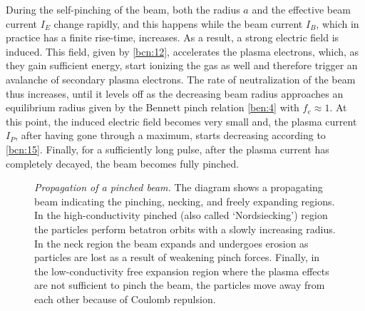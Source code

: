 \documentclass [12pt,a4paper,     ]{report} %
\begin{document}
During the self-pinching of the beam, both the radius $a$ and the effective beam current $I_E$ change rapidly, and this happens while the beam current $I_B$, which in practice has a finite rise-time, increases.  As a result, a strong electric field is induced.  This field, given by \eqref{bcn:12}, accelerates the plasma electrons, which, as they gain sufficient energy, start ionizing the gas as well and therefore trigger an avalanche of secondary plasma electrons.  The rate of neutralization of the beam thus increases, until it levels off as the decreasing beam radius approaches an equilibrium radius given by the Bennett pinch relation \eqref{ben:4} with $f_e \approx 1$.  At this point, the induced electric field becomes very small and, the plasma current $I_P$, after having gone through a maximum, starts decreasing according to \eqref{bcn:15}.  Finally, for a sufficiently long pulse, after the plasma current has completely decayed, the beam becomes fully pinched.

%
\begin{figure}
\begin{center}
\caption[Propagation of a pinched beam]{\emph{Propagation of a pinched beam.} The diagram shows a propagating beam indicating the pinching, necking, and freely expanding regions. In the high-conductivity pinched (also called `Nordsiecking') region the particles perform betatron orbits with a slowly increasing radius.  In the neck region the beam expands and undergoes erosion as particles are lost as a result of weakening pinch forces.  Finally, in the low-conductivity free expansion region where the plasma effects are not sufficient to pinch the beam, the particles move away from each other because of Coulomb repulsion.   
\label{fig:pro}}
\end{center}
\end{figure}
%
\end{document}
